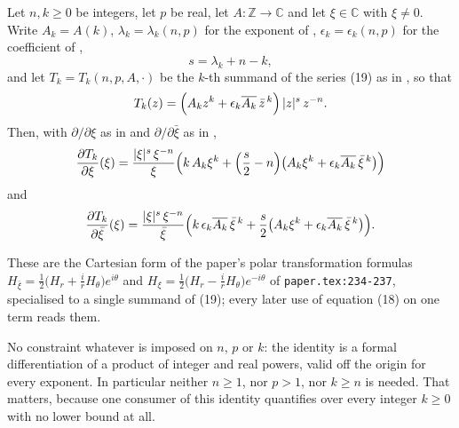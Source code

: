 \begin{helper}
Let $n,k\ge0$ be integers, let $p$ be real, let $A\colon\mathbb{Z}\to\mathbb{C}$
and let $\xi\in\mathbb{C}$ with $\xi\ne0$.  Write $A_k=A(k)$,
$\lambda_k=\lambda_k(n,p)$ for the exponent of ,
$\epsilon_k=\epsilon_k(n,p)$ for the coefficient of ,
\[
  s=\lambda_k+n-k ,
\]
and let $T_k=T_k(n,p,A,\cdot)$ be the $k$-th summand of the series (19) as in
, so that
\[
  T_k(z)=\Bigl(A_kz^{k}+\epsilon_k\overline{A_k}\,\bar z^{\,k}\Bigr)\,|z|^{s}\,z^{-n}.
\]
Then, with $\partial/\partial\xi$ as in  and
$\partial/\partial\bar\xi$ as in ,
\[
  \frac{\partial T_k}{\partial\xi}(\xi)
  =\frac{|\xi|^{s}\,\xi^{-n}}{\xi}
    \Bigl(k\,A_k\xi^{k}
      +\Bigl(\frac{s}{2}-n\Bigr)
        \bigl(A_k\xi^{k}+\epsilon_k\overline{A_k}\,\bar\xi^{\,k}\bigr)\Bigr)
\]
and
\[
  \frac{\partial T_k}{\partial\bar\xi}(\xi)
  =\frac{|\xi|^{s}\,\xi^{-n}}{\bar\xi}
    \Bigl(k\,\epsilon_k\overline{A_k}\,\bar\xi^{\,k}
      +\frac{s}{2}
        \bigl(A_k\xi^{k}+\epsilon_k\overline{A_k}\,\bar\xi^{\,k}\bigr)\Bigr).
\]

These are the Cartesian form of the paper's polar transformation formulas
$H_{\bar\xi}=\tfrac12\bigl(H_r+\tfrac{i}{r}H_\theta\bigr)e^{i\theta}$ and
$H_\xi=\tfrac12\bigl(H_r-\tfrac{i}{r}H_\theta\bigr)e^{-i\theta}$ of
\texttt{paper.tex:234-237}, specialised to a single summand of (19); every
later use of equation (18) on one term reads them.

No constraint whatever is imposed on $n$, $p$ or $k$: the identity is a formal
differentiation of a product of integer and real powers, valid off the origin
for every exponent.  In particular neither $n\ge1$, nor $p>1$, nor $k\ge n$ is
needed.  That matters, because one consumer of this identity quantifies over
every integer $k\ge0$ with no lower bound at all.
\end{helper}
